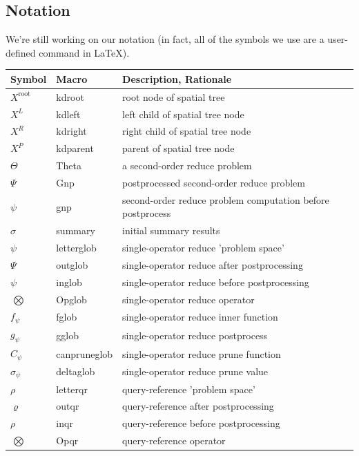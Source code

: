 \documentclass[twoside,leqno,twocolumn]{article}
\newcommand{\summary}{\hat{\sigma}}
\newcommand{\Gnp}{\Psi}
\newcommand{\gnp}{\psi}
\newcommand{\kdroot}[1]{#1^{\text{root}}}
\newcommand{\kdleft}[1]{#1^{\!L}}
\newcommand{\kdright}[1]{#1^{\!R}}
\newcommand{\kdparent}[1]{#1^{\!P}}
\newcommand{\nameOp}[2]{\mathop{#1\nolimits\!\!_{#2}}}
\newcommand{\myOp}[1]{\nameOp{\bigotimes}{#1}}
\newcommand{\letterglob}{\psi}
\newcommand{\outglob}{\Psi}
\newcommand{\inglob}{\psi}
\newcommand{\Opglob}{\myOp{\letterglob}}
\newcommand{\fglob}{f_{\!\letterglob}}
\newcommand{\gglob}{g_{\!\letterglob}}
\newcommand{\canpruneglob}{C_{\!\letterglob}}
\newcommand{\deltaglob}{\summary_{\!\letterglob}}
\newcommand{\letterqr}{\rho}
\newcommand{\outqr}{\varrho}
\newcommand{\inqr}{\rho}
\newcommand{\Opqr}{\myOp{\letterqr}}
\begin{document}
\begin{appendix}

\section{Notation}

We're still working on our notation (in fact, all of the symbols we use are a user-defined command in LaTeX).

\begin{table}
\begin{tabular}{|l|l|l|}
\hline
Symbol & Macro & Description, Rationale
\\ \hline $\kdroot{X}$ & kdroot & root node of spatial tree
\\ $\kdleft{X}$ & kdleft & left child of spatial tree node
\\ $\kdright{X}$ & kdright & right child of spatial tree node
\\ $\kdparent{X}$ & kdparent & parent of spatial tree node
\\ \hline $\Theta$ & Theta & a second-order reduce problem
\\ $\Gnp$ & Gnp & postprocessed second-order reduce problem
\\ $\gnp$ & gnp & second-order reduce problem computation before postprocess
\\ $\summary$ & summary & initial summary results
\\ \hline $\letterglob$ & letterglob & single-operator reduce 'problem space'
\\ $\outglob$ & outglob & single-operator reduce after postprocessing
\\ $\inglob$ & inglob & single-operator reduce before postprocessing
\\ $\Opglob$ & Opglob & single-operator reduce operator
\\ $\fglob$ & fglob & single-operator reduce inner function
\\ $\gglob$ & gglob & single-operator reduce postprocess
\\ $\canpruneglob$ & canpruneglob & single-operator reduce prune function
\\ $\deltaglob$ & deltaglob & single-operator reduce prune value
\\ \hline $\letterqr$ & letterqr & query-reference 'problem space'
\\ $\outqr$ & outqr & query-reference after postprocessing
\\ $\inqr$ & inqr & query-reference before postprocessing
\\ $\Opqr$ & Opqr & query-reference operator

\end{tabular}
\end{table}
\end{appendix}
\end{document}
